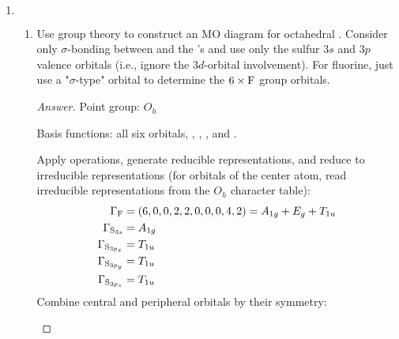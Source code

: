 \documentclass[../psets.tex]{subfiles}
\begin{document}
\begin{enumerate}[label={\Roman*)}]
\begin{enumerate}[label={\alph*)}]
\begin{proof}[Answer]
        \end{proof}
    \end{enumerate}
    \newpage
    \item ${\color{white}x}$
    \begin{enumerate}[label={\alph*)}]
        \item Use group theory to construct an MO diagram for octahedral . Consider only $\sigma$-bonding between  and the 's and use only the sulfur $3s$ and $3p$ valence orbitals (i.e., ignore the $3d$-orbital involvement). For fluorine, just use a "$\sigma$-type" orbital to determine the $6\times\ce{F}$ group orbitals.
        \begin{proof}[Answer]
            Point group: $O_h$\par
            Basis functions: all six  orbitals, , , , and .\par
            Apply operations, generate reducible representations, and reduce to irreducible representations (for orbitals of the center atom, read irreducible representations from the $O_h$ character table):
            \begin{align*}
                \Gamma_{\ce{F}} &= (6,0,0,2,2,0,0,0,4,2) = A_{1g}+E_g+T_{1u}\\
                \Gamma_{\ce{S_{$3s$}}} &= A_{1g}\\
                \Gamma_{\ce{S_{$3p_x$}}} &= T_{1u}\\
                \Gamma_{\ce{S_{$3p_y$}}} &= T_{1u}\\
                \Gamma_{\ce{S_{$3p_z$}}} &= T_{1u}
            \end{align*}
            Combine central and peripheral orbitals by their symmetry:
            \begin{figure}[h!]
                \centering
\end{figure}
\end{proof}
\end{enumerate}
\end{enumerate}
\end{document}
